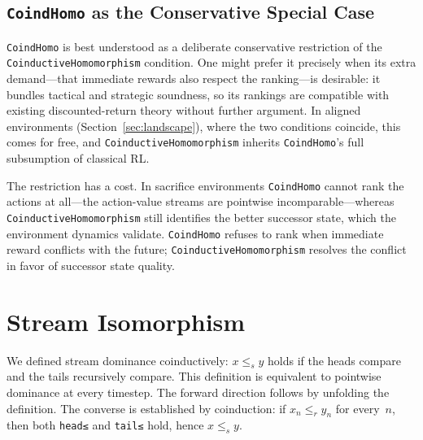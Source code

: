 \documentclass[runningheads]{llncs}
\begin{document}
\subsection{\texttt{CoindHomo} as the Conservative Special Case}

\texttt{CoindHomo} is best understood as a deliberate conservative restriction of the \texttt{CoinductiveHomomorphism} condition.  One might prefer it precisely when its extra demand---that immediate rewards also respect the ranking---is desirable: it bundles tactical and strategic soundness, so its rankings are compatible with existing discounted-return theory without further argument.  In aligned environments (Section~\ref{sec:landscape}), where the two conditions coincide, this comes for free, and \texttt{CoinductiveHomomorphism} inherits \texttt{CoindHomo}'s full subsumption of classical RL.

The restriction has a cost.  In sacrifice environments \texttt{CoindHomo} cannot rank the actions at all---the action-value streams are pointwise incomparable---whereas \texttt{CoinductiveHomomorphism} still identifies the better successor state, which the environment dynamics validate.  \texttt{CoindHomo} refuses to rank when immediate reward conflicts with the future; \texttt{CoinductiveHomomorphism} resolves the conflict in favor of successor state quality.


\section{Stream Isomorphism}\label{sec:stream-iso}

We defined stream dominance coinductively: $x \le_s y$ holds if the heads compare and the tails recursively compare.  This definition is equivalent to pointwise dominance at every timestep.  The forward direction follows by unfolding the definition.  The converse is established by coinduction: if $x_n \le_r y_n$ for every~$n$, then both \texttt{head≤} and \texttt{tail≤} hold, hence $x \le_s y$.
\end{document}
